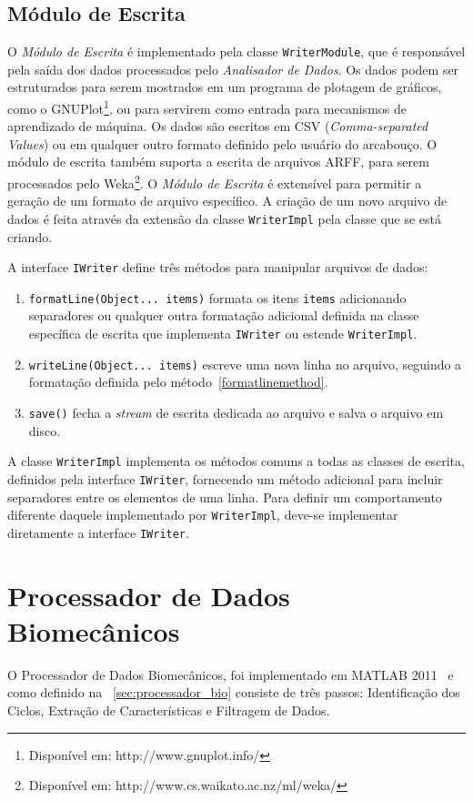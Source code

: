 \subsection{Módulo de Escrita}

O \emph{Módulo de Escrita} é implementado pela classe \texttt{WriterModule}, que é responsável pela saída dos dados processados pelo \emph{Analisador de Dados}. Os dados podem ser estruturados para serem mostrados em um programa de plotagem de gráficos, como o GNUPlot\footnote{Disponível em: http://www.gnuplot.info/}, ou para servirem como entrada para mecanismos de aprendizado de máquina. Os dados são escritos em CSV (\textit{Comma-separated Values}) ou em qualquer outro formato definido pelo usuário do arcabouço. O módulo de escrita também suporta a escrita de arquivos ARFF, para serem processados pelo Weka\footnote{Disponível em: http://www.cs.waikato.ac.nz/ml/weka/}. O \emph{Módulo de Escrita} é extensível para permitir a geração de um formato de arquivo específico. A criação de um novo arquivo de dados é feita através da extensão da classe \texttt{WriterImpl} pela classe que se está criando.

A interface \texttt{IWriter} define três métodos para manipular arquivos de dados:

\begin{enumerate}
	\item \label{formatlinemethod} \texttt{formatLine(Object... items)} formata os itens \texttt{items} adicionando separadores ou qualquer outra formatação adicional definida na classe específica de escrita que implementa \texttt{IWriter} ou estende \texttt{WriterImpl}.
	\item \texttt{writeLine(Object... items)} escreve uma nova linha no arquivo, seguindo a formatação definida pelo método~\ref{formatlinemethod}.
	\item \texttt{save()} fecha a \textit{stream} de escrita dedicada ao arquivo e salva o arquivo em disco.
\end{enumerate}

A classe \texttt{WriterImpl} implementa os métodos comuns a todas as classes de escrita, definidos pela interface \texttt{IWriter}, fornecendo um método adicional para incluir separadores entre os elementos de uma linha. Para definir um comportamento diferente daquele implementado por \texttt{WriterImpl}, deve-se implementar diretamente a interface \texttt{IWriter}.

\section{Processador de Dados Biomecânicos}
O Processador de Dados Biomecânicos, foi implementado em MATLAB 2011~\cite{matlab2011} e como definido na ~\ref{sec:processador_bio} consiste de três passos: Identificação dos Ciclos, Extração de Características e Filtragem de Dados.

